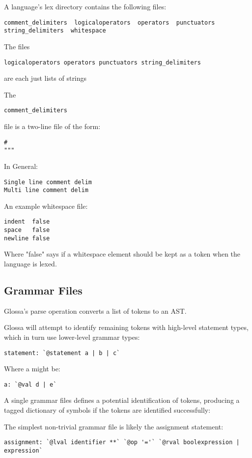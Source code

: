 \documentclass{article}
\begin{document}
A language's lex directory contains the following files:
\begin{verbatim}
comment_delimiters  logicaloperators  operators  punctuators  string_delimiters  whitespace
\end{verbatim}

The files 
\begin{verbatim}
logicaloperators operators punctuators string_delimiters
\end{verbatim}
are each just lists of strings

The 
\begin{verbatim}
comment_delimiters  
\end{verbatim}
file is a two-line file of the form:
\begin{verbatim}
#
""" 
\end{verbatim}
In General:
\begin{verbatim}
Single line comment delim
Multi line comment delim
\end{verbatim}

An example whitespace file:
\begin{verbatim}
indent  false
space   false
newline false
\end{verbatim}
Where "false" says if a whitespace element should be kept as a token when the language is lexed.

\subsection{Grammar Files}

Glossa's parse operation converts a list of tokens to an AST.

Glossa will attempt to identify remaining tokens with high-level statement types, which in turn use lower-level grammar types:
\begin{verbatim}
statement: `@statement a | b | c`
\end{verbatim}
Where a might be:
\begin{verbatim}
a: `@val d | e`
\end{verbatim}

A single grammar files defines a potential identification of tokens, producing a tagged dictionary of symbols if the tokens are identified successfully:

The simplest non-trivial grammar file is likely the assignment statement:
\begin{verbatim}
assignment: `@lval identifier **` `@op '='` `@rval boolexpression | expression`
\end{verbatim}
\end{document}
